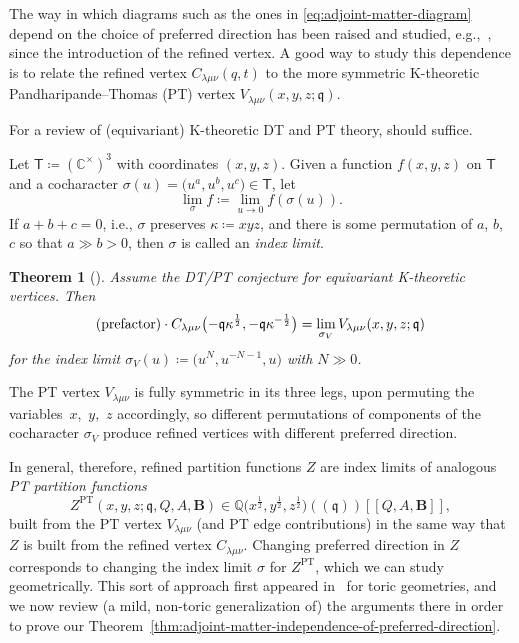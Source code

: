 \documentclass[pdftex]{sigma}%
\numberwithin{equation}{section}
\newtheorem{Theorem}{Theorem}[section]
\renewcommand{\vec}[1]{\bm{#1}}
\newcommand{\bC}{\mathbb{C}}
\newcommand{\bQ}{\mathbb{Q}}
\newcommand{\fq}{\mathfrak{q}}
\newcommand{\sT}{\mathsf{T}}
\DeclareMathOperator{\PT}{PT}
\begin{document}
\begin{MyParagraph}
The way in which diagrams such as the ones in
\eqref{eq:adjoint-matter-diagram} depend on the choice of preferred
direction has been raised \cite{Iqbal2009} and studied, e.g.,~\cite{Awata2013}, since the introduction of the refined vertex. A good
way to study this dependence is to relate the refined vertex
$C_{\lambda\mu\nu}(q,t)$ to the more symmetric K-theoretic
Pandharipande--Thomas (PT) vertex $V_{\lambda\mu\nu}(x,y,z;\fq)$.

For a review of (equivariant) K-theoretic DT and PT theory,
\cite{Okounkov2017} should suffice.

\begin{Definition}
 Let $\sT \coloneqq (\bC^\times)^3$ with coordinates $(x, y, z)$.
 Given a function $f(x,y,z)$ on $\sT$ and a cocharacter
 $\sigma(u) = \big(u^a, u^b, u^c\big) \in \sT$, let
 \[ \lim_\sigma f \coloneqq \lim_{u \to 0} f(\sigma(u)). \]
 If $a+b+c = 0$, i.e., $\sigma$ preserves $\kappa \coloneqq xyz$, and
 there is some permutation of $a$, $b$, $c$ so that $a \gg b > 0$, then
 $\sigma$ is called an {\it index limit}.
\end{Definition}

\begin{Theorem}[{\cite[Theorem~2]{Nekrasov2016a}}] \label{thm:PT-to-refined-vertex}
 Assume the DT/PT conjecture {\rm \cite[formula~(16)]{Nekrasov2016a}} for
 equivariant K-theoretic vertices. Then
 \begin{equation*} %
 (\text{\rm prefactor}) \cdot C_{\lambda\mu\nu}\big({-}\fq\kappa^{\frac{1}{2}}, -\fq\kappa^{-\frac{1}{2}}\big) = \lim_{\sigma_V} V_{\lambda\mu\nu}(x, y, z; \fq)
 \end{equation*}
 for the index limit $\sigma_V(u) \coloneqq \big(u^N, u^{-N-1}, u\big)$ with
 $N \gg 0$.
\end{Theorem}

The PT vertex $V_{\lambda\mu\nu}$ is fully symmetric in its three
legs, upon permuting the variables~$x$,~$y$,~$z$ accordingly, so different
permutations of components of the cocharacter $\sigma_V$ produce refined
vertices with different preferred direction.

In general, therefore, refined partition functions $Z$ are index
limits of analogous {\it PT partition functions}
\begin{equation}\label{eq:PT-partition-function}
 Z^{\PT}(x,y,z; \fq, Q,A,\vec B) \in \bQ\big(x^{\frac{1}{2}},y^{\frac{1}{2}},z^{\frac{1}{2}}\big)((\fq))[[Q,A,\vec B]],
\end{equation}
built from the PT vertex $V_{\lambda\mu\nu}$ (and PT edge
contributions) in the same way that $Z$ is built from the refined
vertex $C_{\lambda\mu\nu}$. Changing preferred direction in $Z$
corresponds to changing the index limit $\sigma$ for $Z^{\PT}$, which
we can study geometrically. This sort of approach first appeared in~\cite{Arbesfeld2021} for toric geometries, and we now review (a mild,
non-toric generalization of) the arguments there in order to prove our
Theorem~\ref{thm:adjoint-matter-independence-of-preferred-direction}.
\end{MyParagraph}
\end{document}

